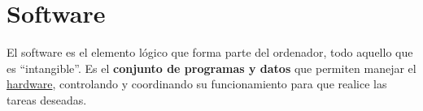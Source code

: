 \chapter{Software}
El software es el elemento lógico que forma parte del ordenador, todo aquello que es “intangible”. Es el \textbf{conjunto de programas y datos} que permiten manejar el \hyperlink{hardware}{hardware}, controlando y coordinando su funcionamiento para que realice las tareas deseadas.



%
%
%
